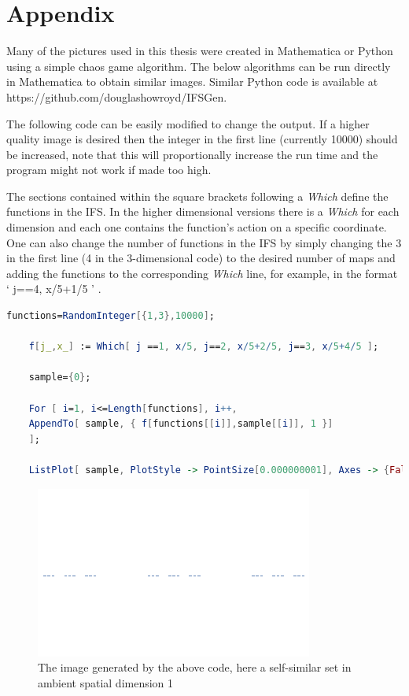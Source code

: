 \chapter*{Appendix}

Many of the pictures used in this thesis were created in Mathematica or Python using a simple chaos game algorithm. The below algorithms can be run directly in Mathematica to obtain similar images. Similar Python code is available at https://github.com/douglashowroyd/IFSGen.

The following code can be easily modified to change the output. If a higher quality image is desired then the integer in the first line (currently 10000) should be increased, note that this will proportionally increase the run time and the program might not work if made too high. 

The sections contained within the square brackets following a \textit{Which} define the functions in the IFS. In the higher dimensional versions there is a \textit{Which} for each dimension and each one contains the function's action on a specific coordinate. One can also change the number of functions in the IFS by simply changing the 3 in the first line (4 in the 3-dimensional code) to the desired number of maps and adding the functions to the corresponding \textit{Which} line, for example, in the format  ` j==4, x/5+1/5 ' .

 
 
  \begin{lstlisting}[language=Mathematica,title={Mathematica code for 1-dimensional images}]
    functions=RandomInteger[{1,3},10000];
    
    f[j_,x_] := Which[ j ==1, x/5, j==2, x/5+2/5, j==3, x/5+4/5 ];
    
    sample={0};
    
    For [ i=1, i<=Length[functions], i++, 
    AppendTo[ sample, { f[functions[[i]],sample[[i]], 1 }] 
    ];
    
    ListPlot[ sample, PlotStyle -> PointSize[0.000000001], Axes -> {False,False}]
  \end{lstlisting}
  
  \begin{figure}[htb]
        \centering
        \includegraphics[width=0.3\linewidth]{pics/appendix/1-d_mathematica.png}
        \caption*{The image generated by the above code, here a self-similar set in ambient spatial dimension 1}
    \end{figure}
  
